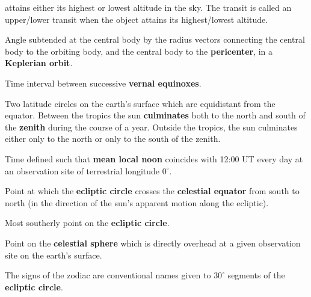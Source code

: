 {\begin{description}
attains either its highest or lowest altitude in the sky. The transit is called
an upper/lower transit when the object attains its highest/lowest altitude. 
\item [True Anomaly:] Angle  subtended at the central body by the radius
vectors connecting the central body to the orbiting body,  and the central body to the
{\bf pericenter}, in a {\bf Keplerian orbit}.
\item [Tropical Year:] Time interval between successive {\bf vernal equinoxes}.
\item [Tropics:] Two latitude circles on the earth's
surface which are equidistant from the equator. Between the tropics the
sun {\bf culminates}\/ both to the north and south of the {\bf zenith}\/
during the course of a year. Outside the tropics, the sun  culminates
either only to the north  or only to the south of the zenith. 
\item [Universal Time:] Time defined such that {\bf mean local noon}\/
coincides with 12:00 UT every day at an observation site of terrestrial
longitude $0^\circ$. 
\item [Vernal Equinox:] Point at which the {\bf ecliptic circle}\/ crosses the {\bf celestial
equator}\/ from south to north (in the direction of the sun's apparent motion
along the ecliptic).
\item [Winter Solstice:] Most southerly point on the {\bf ecliptic circle}.
\item [Zenith:] Point on the {\bf celestial sphere}\/ which is
directly overhead at a given observation site on the earth's surface.
\item [Zodiac:] The signs of the zodiac are conventional names given
to $30^\circ$ segments of the {\bf ecliptic circle}. 
\end{description}}